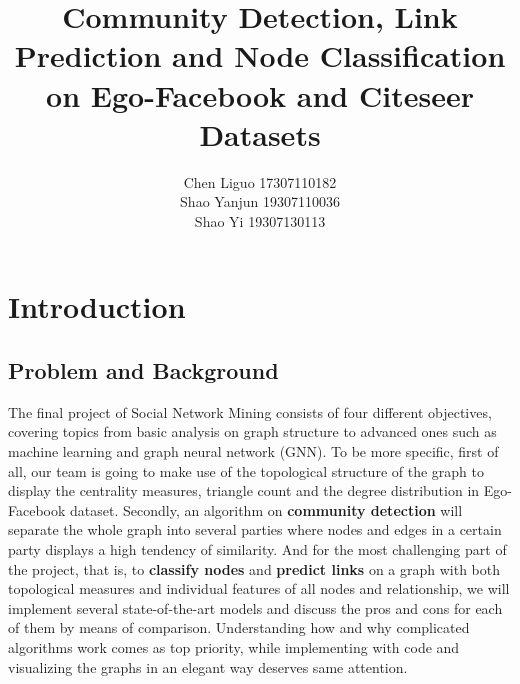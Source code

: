 \documentclass[11pt]{article}
\title{Community Detection, Link Prediction and Node Classification on Ego-Facebook and Citeseer Datasets}
\author{}
\author{}
\author{Chen Liguo  17307110182\\
	Shao Yanjun  19307110036\\
    Shao Yi  19307130113}
\begin{document}
\maketitle


\section{Introduction}
\subsection{Problem and Background}
The final project of Social Network Mining consists of four different objectives, covering topics from basic analysis on graph structure to advanced ones such as machine learning and graph neural network (GNN). To be more specific, first of all, our team is going to make use of the topological structure of the graph to display the centrality measures, triangle count and the degree distribution in Ego-Facebook dataset. Secondly, an algorithm on \textbf{community detection} will separate the whole graph into several parties where nodes and edges in a certain party displays a high tendency of similarity. And for the most challenging part of the project, that is, to \textbf{classify nodes} and \textbf{predict links} on a graph with both topological measures and individual features of all nodes and relationship, we will implement several state-of-the-art models and discuss the pros and cons for each of them by means of comparison. Understanding how and why complicated algorithms work comes as top priority, while implementing with code and visualizing the graphs in an elegant way deserves same attention.
\end{document}
